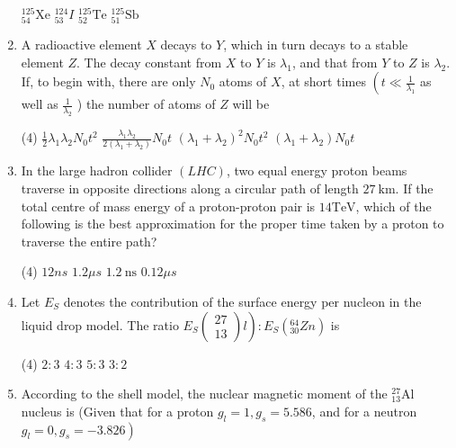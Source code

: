 \begin{enumerate}
\begin{tasks}
		\task[\textbf{A.}] ${ }_{54}^{125} \mathrm{Xe}$
		\task[\textbf{B.}] ${ }_{53}^{124} I$
		\task[\textbf{C.}] ${ }_{52}^{125} \mathrm{Te}$
		\task[\textbf{D.}] ${ }_{51}^{125} \mathrm{Sb}$
	\end{tasks}
	\item A radioactive element $X$ decays to $Y$, which in turn decays to a stable element $Z$. The decay constant from $X$ to $Y$ is $\lambda_{1}$, and that from $Y$ to $Z$ is $\lambda_{2} .$ If, to begin with, there are only $N_{0}$ atoms of $X$, at short times $\left(t \ll \frac{1}{\lambda_{1}}\right.$ as well as $\frac{1}{\lambda_{2}}$ ) the number of atoms of $Z$ will be
	{	}
	\begin{tasks}(4)
		\task[\textbf{A.}] $\frac{1}{2} \lambda_{1} \lambda_{2} N_{0} t^{2}$
		\task[\textbf{B.}] $\frac{\lambda_{1} \lambda_{2}}{2\left(\lambda_{1}+\lambda_{2}\right)} N_{0} t$
		\task[\textbf{C.}] $\left(\lambda_{1}+\lambda_{2}\right)^{2} N_{0} t^{2}$
		\task[\textbf{D.}] $\left(\lambda_{1}+\lambda_{2}\right) N_{0} t$
	\end{tasks}
	\item In the large hadron collider $(L H C)$, two equal energy proton beams traverse in opposite directions along a circular path of length $27 \mathrm{~km}$. If the total centre of mass energy of a proton-proton pair is $14 \mathrm{TeV}$, which of the following is the best approximation for the proper time taken by a proton to traverse the entire path?
	{	}
	\begin{tasks}(4)
		\task[\textbf{A.}] $12 n s$
		\task[\textbf{B.}] $1.2 \mu s$
		\task[\textbf{C.}] $1.2 \mathrm{~ns}$
		\task[\textbf{D.}] $0.12 \mu s$
	\end{tasks}
	\item Let $E_{S}$ denotes the contribution of the surface energy per nucleon in the liquid drop model. The ratio $\left.E_{S}\left(\begin{array}{l}27 \\ 13\end{array}\right) l\right): E_{S}\left({ }_{30}^{64} Z n\right)$ is
	{}
	\begin{tasks}(4)
		\task[\textbf{A.}]  $2: 3$
		\task[\textbf{B.}] $4: 3$
		\task[\textbf{C.}] $5: 3$
		\task[\textbf{D.}] $3: 2$
	\end{tasks}
	\item 	According to the shell model, the nuclear magnetic moment of the ${ }_{13}^{27} \mathrm{Al}$ nucleus is (Given that for a proton $g_{l}=1, g_{s}=5.586$, and for a neutron $\left.g_{l}=0, g_{s}=-3.826\right)$

\end{enumerate}
